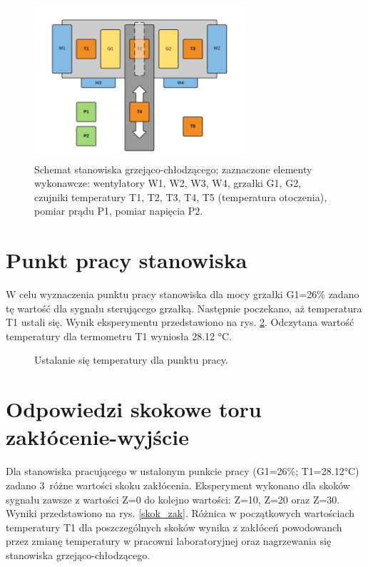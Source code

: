 \documentclass[a4paper,titlepage,11pt,twosides,floatssmall]{mwrep}
\begin{document}
\begin{figure}[H]
		\centering
		\includegraphics[width=0.7\textwidth]{ ./Rysunki/Stanowisko-grzewcze-schemat.png }
		\caption {Schemat stanowiska grzejąco-chłodzącego; zaznaczone elementy wykonawcze: wentylatory W1, W2, W3, W4, grzałki G1, G2, czujniki temperatury T1, T2, T3, T4, T5 (temperatura
otoczenia), pomiar prądu P1, pomiar napięcia P2.}
		\label{stanowisko_grzewcze_schemat}
\end{figure}

\section{Punkt pracy stanowiska}
W celu wyznaczenia punktu pracy stanowiska dla mocy grzałki G1=26\% zadano tę wartość dla sygnału sterującego grzałką. Następnie poczekano, aż temperatura T1 ustali się. Wynik eksperymentu przedstawiono na rys. \ref{punkt_pracy}. Odczytana wartość temperatury dla termometru T1 wyniosła \num{28.12} °C.


\begin{figure}[H]
	\centering
	
	\caption{Ustalanie się temperatury dla punktu pracy.}
	\label{punkt_pracy}
\end{figure}

\section{Odpowiedzi skokowe toru zakłócenie-wyjście}
Dla stanowiska pracującego w ustalonym punkcie pracy (G1=26\%; T1=\num{28.12}°C) zadano 3~różne wartości skoku zakłócenia. Eksperyment wykonano dla skoków sygnału zawsze z wartości Z=0 do kolejno wartości: Z=10, Z=20 oraz Z=30. Wyniki przedstawiono na rys. \ref{skok_zak}. Różnica w początkowych wartościach temperatury T1 dla poszczególnych skoków wynika z zakłóceń powodowanch przez zmianę temperatury w pracowni laboratoryjnej oraz nagrzewania się stanowiska grzejąco-chłodzącego.
\end{document}

